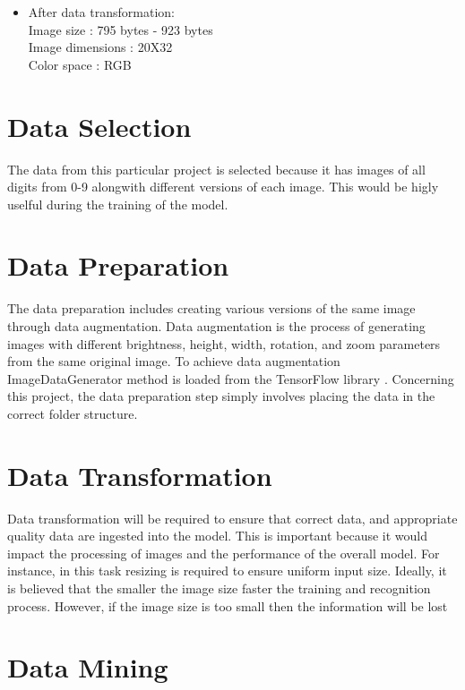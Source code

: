 \begin{itemize}
	\item After data transformation:\\
	Image size : 795 bytes - 923 bytes\\
	Image dimensions : 20X32\\
	Color space : RGB
\end{itemize}

\section{Data Selection}
The data from this particular project is selected because it has images of all digits from 0-9 alongwith different versions of each image. This would be higly uselful during the training of the model.

\section{Data Preparation}
The data preparation includes creating various versions of the same image through data augmentation. Data augmentation is the process of generating images with different brightness, height, width, rotation, and zoom parameters from the same original image. To achieve data augmentation ImageDataGenerator method is loaded from the TensorFlow library \autocite{MakeMedia2021-Part1}. Concerning this project, the data preparation step simply involves placing the data in the correct folder structure.

\section{Data Transformation}
Data transformation will be required to ensure that correct data, and appropriate quality data are ingested into the model. This is important because it would impact the processing of images and the performance of the overall model. For instance, in this task resizing is required to ensure uniform input size. Ideally, it is believed that the smaller the image size faster the training and recognition process. However, if the image size is too small then the information will be lost \autocite{MakeMedia2021-Part1}

\section{Data Mining}


